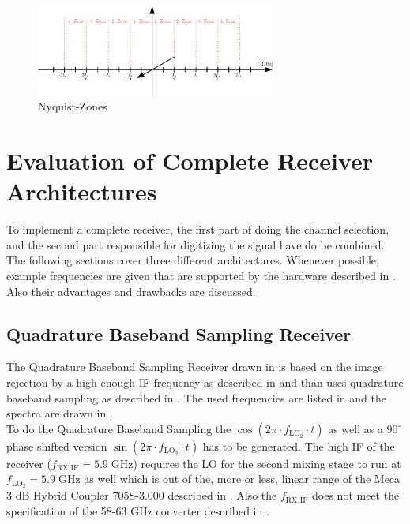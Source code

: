 \begin{figure}[h!]
  \centering
  \includegraphics[width=0.7\textwidth]{figures/rx_adc_2_nyquist_zones}
  \caption{Nyquist-Zones}
  \label{fig:rx_adc_2_nyquist_zones}
\end{figure}

\section{Evaluation of Complete Receiver Architectures}
To implement a complete receiver, the first part of doing the channel selection,
and the second part responsible for digitizing the signal have do be combined. \\

The following sections cover three different architectures. Whenever possible,
example frequencies are given that are supported by the hardware described in
. Also their advantages and drawbacks are discussed. \\

\subsection{Quadrature Baseband Sampling Receiver}
\label{sec:rx_0}
The Quadrature Baseband Sampling Receiver drawn in 
is based on the image rejection by a high enough \gls{IF} frequency as
described in  and than uses quadrature baseband sampling
as described in .
The used frequencies are listed in  and the spectra are drawn
in . \\

To do the Quadrature Baseband Sampling the
$\cos(2\pi \cdot f_{\text{LO}_2} \cdot t)$ as well as a $90^\circ$
phase shifted version $\sin(2\pi \cdot f_{\text{LO}_2} \cdot t)$ has to be
generated.
The high \gls{IF} of the receiver ($f_{\text{RX IF}} = 5.9 \;\text{GHz}$)
requires the \gls{LO} for the second mixing stage to run at
$f_{\text{LO}_2} = 5.9 \;\text{GHz}$ as well which is out of the, more or less,
linear range of the Meca 3 dB Hybrid Coupler 705S-3.000 described in
. Also the $f_{\text{RX IF}}$ does not meet the
specification of the 58-63 GHz converter described in
. \\

